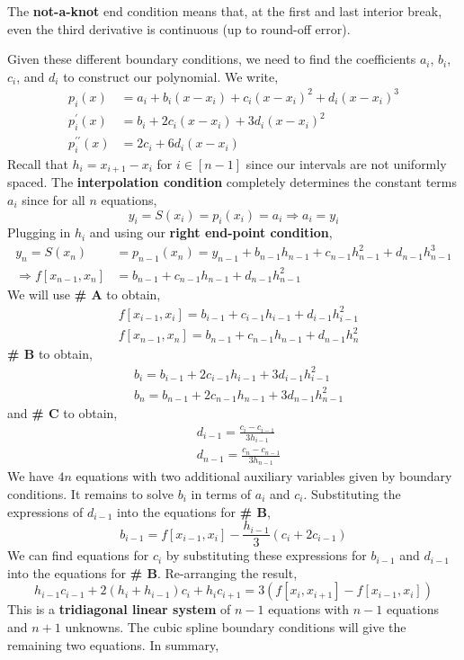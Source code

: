 \begin{marginfigure}
    The \textbf{not-a-knot} end condition means that, at the first and last interior break, even the third derivative is continuous (up to round-off error).
\end{marginfigure}

\noindent Given these different boundary conditions, we need to find the coefficients $a_i$, $b_i$, $c_i$, and $d_i$ to construct our polynomial. We write,
\begin{align*}
p_i(x) &=a_i+b_i\left(x-x_i\right)+c_i\left(x-x_i\right)^2+d_i\left(x-x_i\right)^3 \\
p_i^{\prime}(x) &=b_i+2 c_i\left(x-x_i\right)+3 d_i\left(x-x_i\right)^2 \\
p_i^{\prime \prime}(x) &=2 c_i+6 d_i\left(x-x_i\right)
\end{align*}
Recall that $h_i = x_{i+1} - x_i$ for $i \in [n-1]$ since our intervals are not uniformly spaced. The \textbf{interpolation condition} completely determines the constant terms $a_i$ since for all $n$ equations,
\[y_i=S\left(x_i\right)=p_i\left(x_i\right)=a_i \Rightarrow a_i=y_i\]
Plugging in $h_i$ and using our \textbf{right end-point condition},
\begin{align*}
y_n=S\left(x_n\right) &=p_{n-1}\left(x_n\right)=y_{n-1}+b_{n-1} h_{n-1}+c_{n-1} h_{n-1}^2+d_{n-1} h_{n-1}^3 \\
\Rightarrow f\left[x_{n-1}, x_n\right] &=b_{n-1}+c_{n-1} h_{n-1}+d_{n-1} h_{n-1}^2
\end{align*}
We will use \textbf{\# A} to obtain,
\begin{align*}
    &f\left[x_{i-1}, x_i\right]=b_{i-1}+c_{i-1} h_{i-1}+d_{i-1} h_{i-1}^2 \\
    &f\left[x_{n-1}, x_n\right]=b_{n-1}+c_{n-1} h_{n-1}+d_{n-1} h_n^2
\end{align*}
\textbf{\# B} to obtain,
\begin{align*}
    &b_i=b_{i-1}+2 c_{i-1} h_{i-1}+3 d_{i-1} h_{i-1}^2 \\
    &b_n=b_{n-1}+2 c_{n-1} h_{n-1}+3 d_{n-1} h_{n-1}^2
\end{align*}
and \textbf{\# C} to obtain,
\begin{align*}
&d_{i-1}=\frac{c_i-c_{i-1}}{3 h_{i-1}} \\
&d_{n-1}=\frac{c_n-c_{n-1}}{3 h_{n-1}}
\end{align*}
We have $4n$ equations with two additional auxiliary variables given by boundary conditions. It remains to solve $b_i$ in terms of $a_i$ and $c_i$. Substituting the expressions of $d_{i-1}$ into the equations for \textbf{\# B},
\[b_{i-1}=f\left[x_{i-1}, x_i\right]-\frac{h_{i-1}}{3}\left(c_i+2 c_{i-1}\right)\]
We can find equations for $c_i$ by substituting these expressions for $b_{i-1}$ and $d_{i-1}$ into the equations for \textbf{\# B}. Re-arranging the result,
\[h_{i-1} c_{i-1}+2\left(h_i+h_{i-1}\right) c_i+h_i c_{i+1}=3\left(f\left[x_i, x_{i+1}\right]-f\left[x_{i-1}, x_i\right]\right)\]
This is a \textbf{tridiagonal linear system} of $n - 1$ equations with $n - 1$ equations and $n + 1$ unknowns. The cubic spline boundary conditions will give the remaining two equations. In summary,

